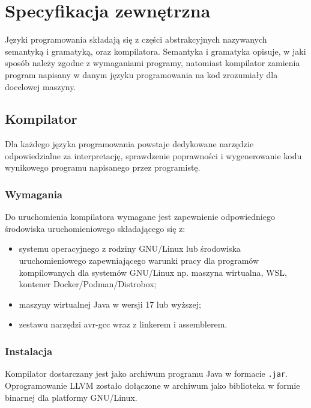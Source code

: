 \chapter{Specyfikacja zewnętrzna}
\label{ch:04}
Języki programowania składają się z części abstrakcyjnych nazywanych semantyką i gramatyką, oraz kompilatora. Semantyka i gramatyka opisuje, w jaki sposób należy zgodne z wymaganiami programy, natomiast kompilator zamienia program napisany w danym języku programowania na kod zrozumiały dla docelowej maszyny.
\section{Kompilator}
Dla każdego języka programowania powstaje dedykowane narzędzie odpowiedzialne za interpretację, sprawdzenie poprawności i wygenerowanie kodu wynikowego programu napisanego przez programistę.
\subsection{Wymagania}
Do uruchomienia kompilatora wymagane jest zapewnienie odpowiedniego środowiska uruchomieniowego składającego się z:
\begin{itemize}
\item systemu operacyjnego z rodziny GNU/Linux lub środowiska uruchomieniowego zapewniającego warunki pracy dla programów kompilowanych dla systemów GNU/Linux np. maszyna wirtualna, WSL, kontener Docker/Podman/Distrobox;
\item maszyny wirtualnej Java w wersji 17 lub wyższej;
\item zestawu narzędzi avr-gcc wraz z linkerem i assemblerem.
\end{itemize}

\subsection{Instalacja}
Kompilator dostarczany jest jako archiwum programu Java w formacie \lstinline|.jar|. Oprogramowanie LLVM zostało dołączone w archiwum jako biblioteka w formie binarnej dla platformy GNU/Linux.

